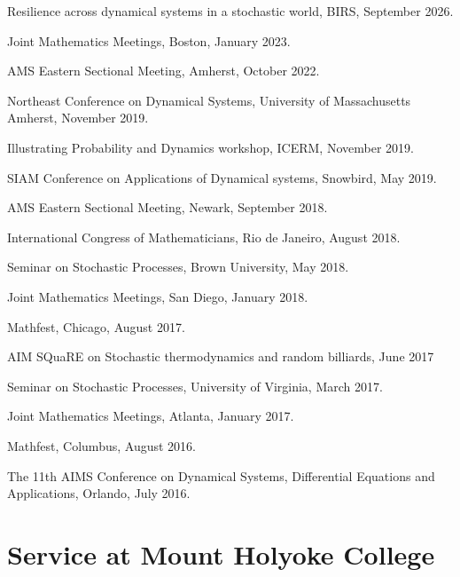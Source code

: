 \documentclass[10pt,letterpaper]{article}
\renewenvironment{itemize}{
  \begin{list}{}{
    \setlength{\leftmargin}{1.5em}
    \setlength{\itemsep}{0.25em}
    \setlength{\parskip}{0pt}
    \setlength{\parsep}{0.25em}
  }
}{
  \end{list}
}
\begin{document}
\begin{itemize}
\item
  Resilience across dynamical systems in a stochastic world, BIRS,
  September 2026.
\item
  Joint Mathematics Meetings, Boston, January 2023.
\item
  AMS Eastern Sectional Meeting, Amherst, October 2022.
\item
  Northeast Conference on Dynamical Systems, University of Massachusetts
  Amherst, November 2019.
\item
  Illustrating Probability and Dynamics workshop, ICERM, November 2019.
\item
  SIAM Conference on Applications of Dynamical systems, Snowbird, May
  2019.
\item
  AMS Eastern Sectional Meeting, Newark, September 2018.
\item
  International Congress of Mathematicians, Rio de Janeiro, August 2018.
\item
  Seminar on Stochastic Processes, Brown University, May 2018.
\item
  Joint Mathematics Meetings, San Diego, January 2018.
\item
  Mathfest, Chicago, August 2017.
\item
  AIM SQuaRE on Stochastic thermodynamics and random billiards, June
  2017
\item
  Seminar on Stochastic Processes, University of Virginia, March 2017.
\item
  Joint Mathematics Meetings, Atlanta, January 2017.
\item
  Mathfest, Columbus, August 2016.
\item
  The 11th AIMS Conference on Dynamical Systems, Differential Equations
  and Applications, Orlando, July 2016.
\end{itemize}

\hypertarget{service-at-mount-holyoke-college}{%
\section*{Service at Mount Holyoke
College}\label{service-at-mount-holyoke-college}}
\end{document}

